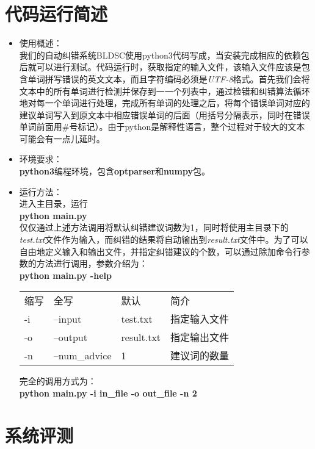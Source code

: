 \documentclass[UTF8,a4paper]{ctexart}
\begin{document}
\section{代码运行简述}

\begin{itemize}
    \item 使用概述： \\
    我们的自动纠错系统BLDSC使用python3代码写成，当安装完成相应的依赖包后就可以进行测试。代码运行时，获取指定的输入文件，该输入文件应该是包含单词拼写错误的英文文本，而且字符编码必须是\textit{UTF-8}格式。首先我们会将文本中的所有单词进行检测并保存到一一个列表中，通过检错和纠错算法循环地对每一个单词进行处理，完成所有单词的处理之后，将每个错误单词对应的建议单词写入到原文本中相应错误单词的后面（用括号分隔表示，同时在错误单词前面用\#号标记）。由于python是解释性语言，整个过程对于较大的文本可能会有一点儿延时。
  \item 环境要求： \\
  \textbf{python3}编程环境，包含\textbf{optparser}和\textbf{numpy}包。
  \item 运行方法： \\
  进入主目录，运行 \\
  \quad \textbf{python main.py} \\
  仅仅通过上述方法调用将默认纠错建议词数为1，同时将使用主目录下的\textit{test.txt}文件作为输入，而纠错的结果将自动输出到\textit{result.txt}文件中。为了可以自由地定义输入和输出文件，并指定纠错建议的个数，可以通过除加命令行参数的方法进行调用，参数介绍为： \\
  \quad \textbf{python main.py -help}

  \begin{tabular}{|l|l|l|l|}
    \hline
    缩写 & 全写 & 默认 & 简介 \\
    -i & --input & test.txt & 指定输入文件 \\
    -o & --output & result.txt & 指定输出文件 \\
    -n & --num\_advice & 1 & 建议词的数量  \\
    \hline
  \end{tabular}

  完全的调用方式为： \\
  \quad \textbf{python main.py -i in\_file -o out\_file -n 2}
\end{itemize}

\section{系统评测}
\end{document}
